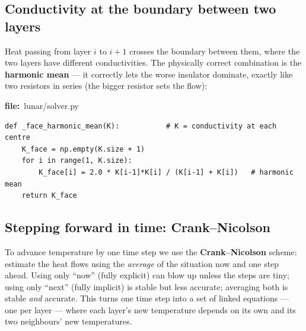 \documentclass[11pt]{article}
\newcommand{\codefile}[1]{\par\smallskip\noindent
  {\footnotesize\ttfamily\color{teal!55!black}\textbf{file:}~#1}\par\nopagebreak}
\renewcommand{\codefile}[1]{\par\smallskip\noindent
    {\footnotesize\ttfamily\color{black}\textbf{file:}~#1}\par\nopagebreak}
\begin{document}
\subsection{Conductivity at the boundary between two layers}
Heat passing from layer $i$ to $i{+}1$ crosses the boundary between them,
where the two layers have different conductivities. The physically
correct combination is the \textbf{harmonic mean} --- it correctly lets
the worse insulator dominate, exactly like two resistors in series (the
bigger resistor sets the flow):
\codefile{lunar/solver.py}
\begin{lstlisting}
def _face_harmonic_mean(K):           # K = conductivity at each centre
    K_face = np.empty(K.size + 1)
    for i in range(1, K.size):
        K_face[i] = 2.0 * K[i-1]*K[i] / (K[i-1] + K[i])   # harmonic mean
    return K_face
\end{lstlisting}

\subsection{Stepping forward in time: Crank--Nicolson}
To advance temperature by one time step we use the
\textbf{Crank--Nicolson} scheme: estimate the heat flows using the
\emph{average} of the situation now and one step ahead. Using only
``now'' (fully explicit) can blow up unless the steps are tiny; using
only ``next'' (fully implicit) is stable but less accurate; averaging
both is stable \emph{and} accurate. This turns one time step into a set
of linked equations --- one per layer --- where each layer's new
temperature depends on its own and its two neighbours' new temperatures.
\end{document}
